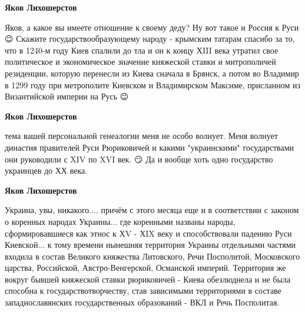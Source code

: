 \begin{itemize}
\begin{itemize}
\textbf{Яков Лихошерстов} 

Яков, а какое вы имеете отношение к своему деду? Ну вот такое и Россия к Руси
😉 Скажите государствообразующему народу - крымским татарам спасибо за то, что
в 1240-м году Киев спалили до тла и он к концу ХIII века утратил свое
политическое и экономическое значение княжеской ставки и митрополичей
резиденции, которую перенесли из Киева сначала в Брянск, а потом во Владимир в
1299 году при метрополите Киевском и Владимирском Максиме, присланном из
Византийской империи на Русь 😉


 
\textbf{Яков Лихошерстов} 

тема вашей персональной генеалогии меня не особо волнует. Меня волнует династия
правителей Руси Рюриковичей и какими "украинскими" государствами они руководили
с XIV по XVI век. 😏 Да и вообще хоть одно государство украинцев до ХХ века.


 
\textbf{Яков Лихошерстов} 

Украина, увы, никакого.... причём с этого месяца еще и в соответствии с законом
о коренных народах Украины... где коренными названы народы, сформировавшиеся
как этнос к ХV - ХIX веку и способствовали падению Руси Киевской... к тому
времени нынешняя территория Украины отдельными частями входила в состав
Великого княжества Литовского, Речи Посполитой, Московского царства,
Российской, Австро-Венгерской, Османской империй. Территория же вокруг бывшей
княжеской ставки рюриковичей - Киева обезлюднела и не была способна к
государствотворчеству, став зависимыми территориями в составе западнославянских
государственных образований - ВКЛ и Речь Посполитая.

 

\end{itemize}
\end{itemize}
